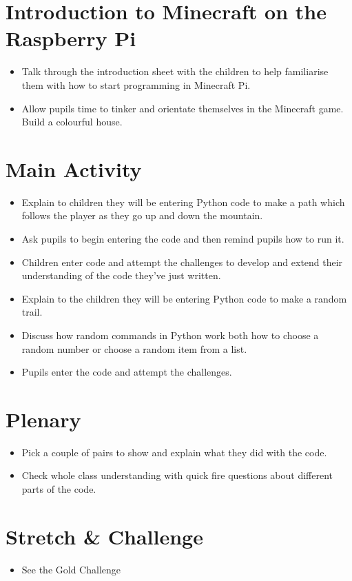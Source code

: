 \documentclass{geocraft-lesson-plan}
\begin{document}
\section*{Introduction to Minecraft on the Raspberry Pi}
\begin{itemize}
\item Talk through the introduction sheet with the children to help
  familiarise them with how to start programming in Minecraft Pi. 
\item Allow pupils time to tinker and orientate themselves in the
  Minecraft game. Build a colourful house. 
\end{itemize}

\section*{Main Activity}
\begin{itemize}
\item Explain to children they will be entering Python code to make a
  path which follows the player as they go up and down the mountain. 
\item Ask pupils to begin entering the code and then remind pupils how
  to run it. 
\item Children enter code and attempt the challenges to develop and
  extend their understanding of the code they’ve just written. 
\item Explain to the children they will be entering Python code to
  make a random trail. 
\item Discuss how random commands in Python work both how to choose a
  random number or choose a random item from a list. 
\item Pupils enter the code and attempt the challenges. 
\end{itemize}

\section*{Plenary}
\begin{itemize}
\item Pick a couple of pairs to show and explain what they did with
  the code. 
\item Check whole class understanding with quick fire questions about
  different parts of the code. 
\end{itemize}


\section*{Stretch \& Challenge}
\begin{itemize}
\item See the Gold Challenge
\end{itemize}
\end{document}
